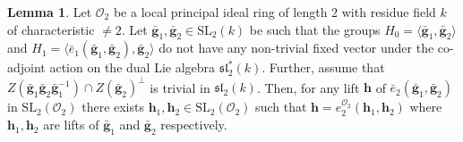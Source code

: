 \documentclass[10pt,twoside]{amsart}
\newcommand{\SL}{\mathrm{SL}}
\theoremstyle{definition}
\theoremstyle{definition}
\newtheorem{lemma}[theorem]{Lemma}
\begin{document}
\begin{lemma}{\label{lem-adelic 2}}
Let $\mathcal{O}_2$ be a local principal ideal ring of length $2$ with residue field $k$ of characteristic $\neq 2$. Let $\mathbf{\bar g}_1, \mathbf{\bar g}_2 \in \SL_2(k)$ be such that the groups $H_0 = \langle \mathbf{\bar g}_1,\mathbf{\bar g}_2\rangle$ and $ H_1=\langle \bar e_1(\mathbf{\bar g}_1,\mathbf{\bar g}_2),\mathbf{\bar g}_2\rangle$ do not have any non-trivial fixed vector under the co-adjoint action on the dual Lie algebra $\mathfrak{sl}_2^*(k)$. Further, assume that $Z\left(\mathbf{\bar g}_1\mathbf{\bar g}_2\mathbf{\bar g}_1^{-1}\right)\cap Z\left(\mathbf{\bar g}_2\right)^{\perp}$ is trivial in $\mathfrak{sl}_2(k)$. Then, for any lift $\mathbf{h}$ of $\bar e_{2}(\mathbf{\bar g}_1, \mathbf{\bar g}_2)$ in $\SL_2(\mathcal O_2)$ there exists $\mathbf{h}_1, \mathbf{ h}_2\in\SL_2(\mathcal{O}_2)$ such that $\mathbf{h} = e_{2}^{\mathcal{O}_2}(\mathbf{h}_1, \mathbf{h}_2)$ where $\mathbf{h}_1, \mathbf{ h}_2$ are lifts of $\mathbf{\bar g}_1$ and $\mathbf{\bar g}_2$ respectively.
\end{lemma}
\end{document}
